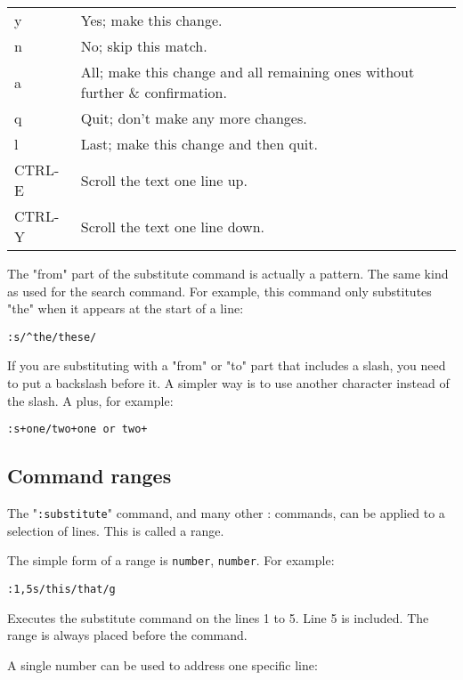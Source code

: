 {\begin{center}\begin{tabular}{l l}
				y & Yes; make this change. \\
				n & No; skip this match. \\
				a & All; make this change and all remaining ones without further \& confirmation. \\
				q & Quit; don't make any more changes. \\
				l & Last; make this change and then quit. \\
				CTRL-E & Scroll the text one line up. \\
				CTRL-Y & Scroll the text one line down. \\
\end{tabular}\end{center}

The "from" part of the substitute command is actually a pattern.
The same kind as used for the search command.
For example, this command only substitutes "the" when it appears at the start of a line:

\begin{Verbatim}[samepage=true]
 :s/^the/these/
\end{Verbatim}

If you are substituting with a "from" or "to" part that includes a slash, you need to put a backslash before it.
A simpler way is to use another character instead of the slash.
A plus, for example:

\begin{Verbatim}[samepage=true]
 :s+one/two+one or two+
\end{Verbatim}
\subsection{Command ranges}
\label{Command ranges}
The "\texttt{:substitute}" command, and many other : commands, can be applied to a selection of lines.
This is called a range.

The simple form of a range is \texttt{{number}}, \texttt{{number}}.
For example:

\begin{Verbatim}[samepage=true]
 :1,5s/this/that/g
\end{Verbatim}

Executes the substitute command on the lines 1 to 5.
Line 5 is included.
The range is always placed before the command.

A single number can be used to address one specific line:

}
